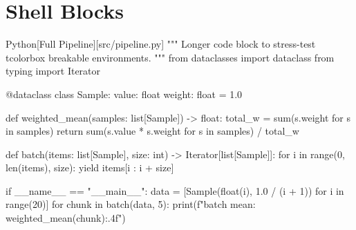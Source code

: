 \documentclass[code=listings]{SUSTechHomework}
\begin{document}
\section{Shell Blocks}


\begin{sustechlongcode}{Python}[Full Pipeline][src/pipeline.py]
"""
Longer code block to stress-test tcolorbox breakable environments.
"""
from dataclasses import dataclass
from typing import Iterator

@dataclass
class Sample:
    value: float
    weight: float = 1.0

def weighted_mean(samples: list[Sample]) -> float:
    total_w = sum(s.weight for s in samples)
    return sum(s.value * s.weight for s in samples) / total_w

def batch(items: list[Sample], size: int) -> Iterator[list[Sample]]:
    for i in range(0, len(items), size):
        yield items[i : i + size]

if __name__ == "__main__":
    data = [Sample(float(i), 1.0 / (i + 1)) for i in range(20)]
    for chunk in batch(data, 5):
        print(f"batch mean: {weighted_mean(chunk):.4f}")
\end{sustechlongcode}
\end{document}
